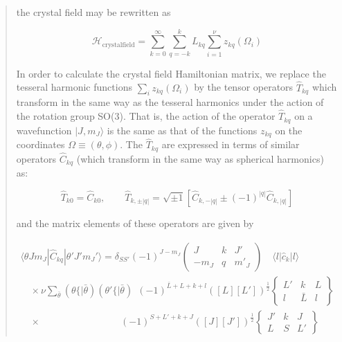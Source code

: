 \begin{quotation}
the crystal field may be rewritten as

\begin{equation}
\mathcal H_{\mathrm{crystalfield}}=  \sum_{k=0}^{\infty} \sum_{q=-k}^k  L_{kq} \sum_{i=1}^\nu z_{kq}(\Omega_i)
\end{equation}

In order to calculate the crystal field Hamiltonian matrix, we replace the tesseral harmonic
functions $\sum_i z_{kq}(\Omega_i)$ by the tensor operators $\hat{T}_{kq}$ which transform in the
same way as the tesseral harmonics under the action of the rotation group SO(3). That is, the action
of the operator $\hat{T}_{kq}$ on a wavefunction $|J,m_J\rangle$ is the same as that of the
functions $z_{kq}$ on the coordinates $\Omega \equiv (\theta,\phi)$. The $\hat{T}_{kq}$ are
expressed in terms of similar operators $\hat{C}_{kq}$ (which transform in the same way as spherical
harmonics) as:

\begin{equation} \label{tkqhermitian}
  \hat{T}_{k0} = \hat{C}_{k0}, \qquad \hat{T}_{k,\pm|q|} = \sqrt{\pm 1} \left[
  \hat{C}_{k,-|q|} \pm (-1)^{|q|} \hat{C}_{k,|q|} \right]
\end{equation}

\noindent and the matrix elements of these operators are given by 

\begin{equation} \label{iccfmatel}
\begin{array}{l}
\langle \theta J m_J | \hat{C}_{kq} | \theta' J' m_J' \rangle = \delta_{SS'} (-1)^{J-m_J}
       \left( \begin{array}{ccc} J & k & J' \\ -m_J & q & m'_J \end{array} \right)
       \quad \langle l | \hat{c}_k | l \rangle  \\
 \quad \times \nu \sum_{\bar{\theta}} (\theta\{|\bar{\theta}) (\theta'\{|\bar{\theta})
       \ \  (-1)^{\bar{L}+L+k+l} ([L][L'])^{\frac{1}{2}}
       \left\{ \begin{array}{ccc} L' & k & L \\ l & \bar{L} & l \end{array} \right\}  \\
 \quad \times \qquad\qquad\qquad\qquad\  (-1)^{S+L'+k+J} ([J][J'])^{\frac{1}{2}}
       \left\{ \begin{array}{ccc} J' & k & J \\ L & S & L' \end{array} \right\}
\end{array}
\end{equation}


\end{quotation}
